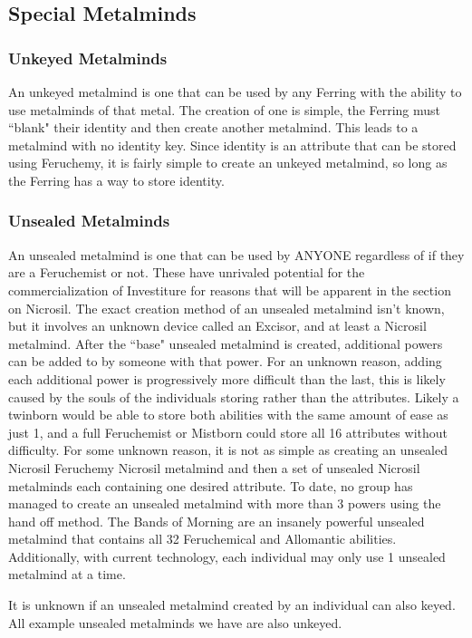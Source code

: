 \documentclass[conference]{IEEEtran}
\begin{document}
\subsection*{Special Metalminds}
\subsubsection*{Unkeyed Metalminds}\hfill\break
An unkeyed metalmind is one that can be used by any Ferring with the ability to use metalminds of that metal.  The creation of one is simple, the Ferring must ``blank" their identity and then create another metalmind.  This leads to a metalmind with no identity key.  Since identity is an attribute that can be stored using Feruchemy, it is fairly simple to create an unkeyed metalmind, so long as the Ferring has a way to store identity.
\hfill\break
\subsubsection*{Unsealed Metalminds}\hfill\break
An unsealed metalmind is one that can be used by ANYONE regardless of if they are a Feruchemist or not.  These have unrivaled potential for the commercialization of Investiture for reasons that will be apparent in the section on Nicrosil.  The exact creation method of an unsealed metalmind isn't known, but it involves an unknown device called an Excisor, and at least a Nicrosil metalmind.  After the ``base" unsealed metalmind is created, additional powers can be added to by someone with that power.  For an unknown reason, adding each additional power is progressively more difficult than the last, this is likely caused by the souls of the individuals storing rather than the attributes.  Likely a twinborn would be able to store both abilities with the same amount of ease as just 1, and a full Feruchemist or Mistborn could store all 16 attributes without difficulty.  For some unknown reason, it is not as simple as creating an unsealed Nicrosil Feruchemy Nicrosil metalmind and then a set of unsealed Nicrosil metalminds each containing one desired attribute.  To date, no group has managed to create an unsealed metalmind with more than 3 powers using the hand off method.  The Bands of Morning are an insanely powerful unsealed metalmind that contains all 32 Feruchemical and Allomantic abilities.  Additionally, with current technology, each individual may only use 1 unsealed metalmind at a time.

It is unknown if an unsealed metalmind created by an individual can also keyed.  All example unsealed metalminds we have are also unkeyed.
\end{document}
